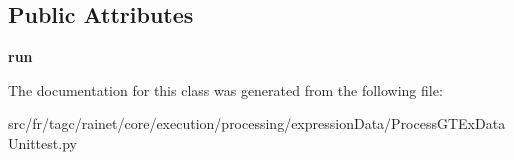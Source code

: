 \subsection*{Public Attributes}
\begin{DoxyCompactItemize}
\item 
\hypertarget{classsrc_1_1fr_1_1tagc_1_1rainet_1_1core_1_1execution_1_1processing_1_1expressionData_1_1Processf5d344d00bd46ca2801f8916309b84ab_ae547ee24bb620ccf29a1dbaa0c3ced60}{{\bfseries run}}\label{classsrc_1_1fr_1_1tagc_1_1rainet_1_1core_1_1execution_1_1processing_1_1expressionData_1_1Processf5d344d00bd46ca2801f8916309b84ab_ae547ee24bb620ccf29a1dbaa0c3ced60}

\end{DoxyCompactItemize}


The documentation for this class was generated from the following file\-:\begin{DoxyCompactItemize}
\item 
src/fr/tagc/rainet/core/execution/processing/expression\-Data/Process\-G\-T\-Ex\-Data\-Unittest.\-py\end{DoxyCompactItemize}
